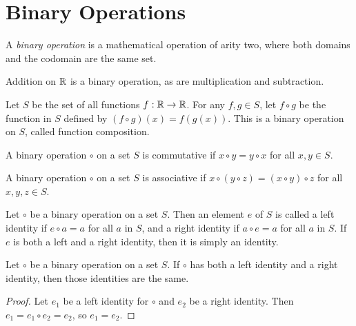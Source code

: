 \section{Binary Operations}

\begin{defn}
    A \emph{binary operation} is a mathematical operation of arity two, where both domains and the codomain are the same set.
\end{defn}

\begin{exmp}
    Addition on $\mathbb{R}$ is a binary operation, as are multiplication and subtraction.
\end{exmp}

\begin{exmp}
    Let $S$ be the set of all functions $f : \mathbb{R} \to \mathbb{R}$. For any $f, g \in S$, let $f \circ g$ be the function in $S$ defined by $(f \circ g)(x) = f(g(x))$. This is a binary operation on $S$, called function composition.
\end{exmp}

\begin{defn}
    A binary operation $\circ$ on a set $S$ is commutative if $x \circ y = y \circ x$ for all $x, y \in S$.
\end{defn}

\begin{defn}
    A binary operation $\circ$ on a set $S$ is associative if $x \circ (y \circ z) = (x \circ y) \circ z$ for all $x, y, z \in S$.
\end{defn}

\begin{defn}\label{identity}
    Let $\circ$ be a binary operation on a set $S$. Then an element $e$ of $S$ is called a left identity if $e \circ a = a$ for all $a$ in $S$, and a right identity if $a \circ e = a$ for all $a$ in $S$. If $e$ is both a left and a right identity, then it is simply an identity.
\end{defn}

\begin{thm}
    Let $\circ$ be a binary operation on a set $S$. If $\circ$ has both a left identity and a right identity, then those identities are the same.
\end{thm}

\begin{proof}
    Let $e_1$ be a left identity for $\circ$ and $e_2$ be a right identity. Then $e_1 = e_1 \circ e_2 = e_2$, so $e_1 = e_2$.
\end{proof}

